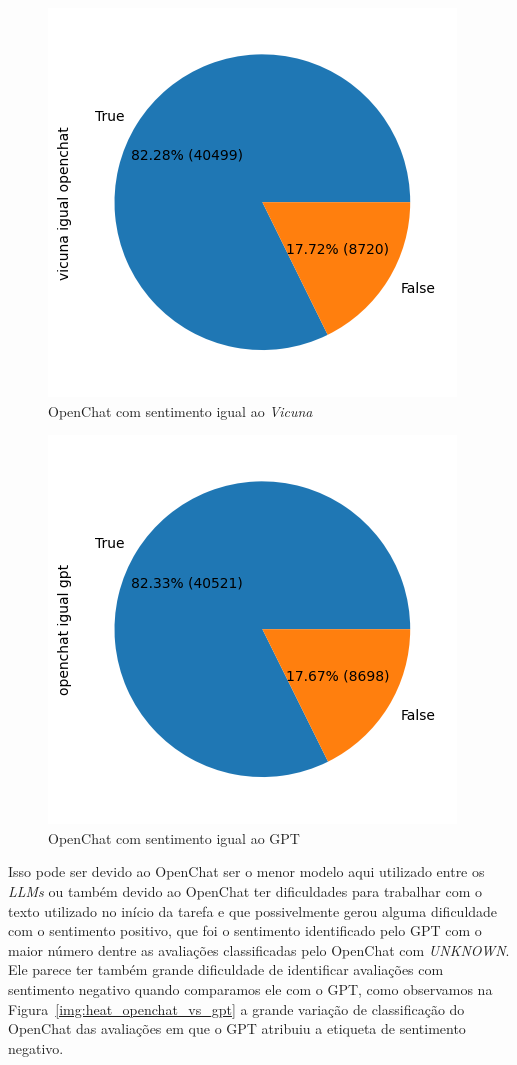 \begin{figure}
	\centering
	\includegraphics{figs/openchat/vs_vicuna.png}
	\caption{OpenChat com sentimento igual ao \textit{Vicuna}}
	\label{img:openchat_vs_vicuna}
\end{figure}

\begin{figure}
	\centering
	\includegraphics{figs/openchat/vs_gpt.png}
	\caption{OpenChat com sentimento igual ao GPT}
	\label{img:openchat_vs_gpt}
\end{figure}

Isso pode ser devido ao OpenChat ser o menor modelo aqui utilizado entre os \textit{LLMs} ou também devido ao OpenChat ter dificuldades para trabalhar com o texto utilizado no início da tarefa e que possivelmente gerou alguma dificuldade com o sentimento positivo, que foi o sentimento identificado pelo GPT com o maior número dentre as avaliações classificadas pelo OpenChat com \textit{UNKNOWN}. Ele parece ter também grande dificuldade de identificar avaliações com sentimento negativo quando comparamos ele com o GPT, como observamos na Figura~\ref{img:heat_openchat_vs_gpt} a grande variação de classificação do OpenChat das avaliações em que o GPT atribuiu a etiqueta de sentimento negativo.

